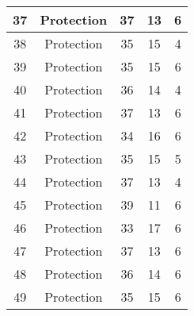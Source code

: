 \documentclass[results.tex]{subfiles}
\begin{document}
\begin{center}
\begin{tabular}{| c || c | c | c | c |}
            \hline
            37                      & Protection                   & 37                     & 13                      & 6                    \\
            \hline
            38                      & Protection                   & 35                     & 15                      & 4                    \\
            \hline
            39                      & Protection                   & 35                     & 15                      & 6                    \\
            \hline
            40                      & Protection                   & 36                     & 14                      & 4                    \\
            \hline
            41                      & Protection                   & 37                     & 13                      & 6                    \\
            \hline
            42                      & Protection                   & 34                     & 16                      & 6                    \\
            \hline
            43                      & Protection                   & 35                     & 15                      & 5                    \\
            \hline
            44                      & Protection                   & 37                     & 13                      & 4                    \\
            \hline
            45                      & Protection                   & 39                     & 11                      & 6                    \\
            \hline
            46                      & Protection                   & 33                     & 17                      & 6                    \\
            \hline
            47                      & Protection                   & 37                     & 13                      & 6                    \\
            \hline
            48                      & Protection                   & 36                     & 14                      & 6                    \\
            \hline
            49                      & Protection                   & 35                     & 15                      & 6                    \\
            \hline
        \end{tabular}
    \end{center}
\end{document}
